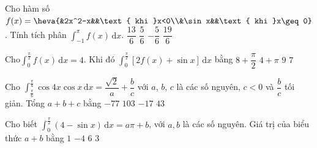 \begin{ex}%
	Cho hàm số $f(x)=\heva{&2x^2-x&&\text{ khi }x<0\\&\sin x&&\text{ khi }x\geq 0}$. Tính tích phân $\displaystyle\int_{-1}^{\pi}f(x)\mathrm{\,d}x$. 
	 \choice
		{$\dfrac{13}{6}$} 
		{$\dfrac{5}{6}$} 
		 {$-\dfrac{5}{6}$}
		{\True $\dfrac{19}{6}$} 
\end{ex}

\begin{ex}%
	Cho$\displaystyle\int_0^{\tfrac\pi2}{f(x)}\mathrm{\,d}x=4$. Khi đó $\displaystyle\int_0^{\tfrac\pi2}{\left[2f(x)+\sin x\right]}\mathrm{\,d}x$ bằng 
	\choice 
		{$8+\dfrac\pi2$} 
		{$4+\pi$} 
		{\True  $9$}
		{$7$} 
\end{ex}

\begin{ex}%
	Cho $\displaystyle\int_{\tfrac{\pi }6}^{\tfrac{\pi }4}{\cos 4x\cos x\mathrm{\,d}x}=\dfrac{\sqrt2}a+\dfrac bc$ với $ a$, $b$, $c$ là  các số nguyên, $ c<0$ và $\dfrac bc$ tối giản. Tổng $ a+b+c$ bằng
	 \choice
		{$-77$} 
		{$103$} 
		{\True  $-17$}
		 {$43$}
\end{ex}

\begin{ex}%
	Cho biết $\displaystyle\int_0^{\tfrac\pi2}{\left(4-\sin x\right)\mathrm{\,d}x}=a\pi+b$, với $ a,b$ là các số nguyên.  Giá trị của biểu thức $ a+b$ bằng
	\choice 
		{\True  $1$}
		{$-4$} 
		 {$6$}
		 {$3$}
\end{ex}

